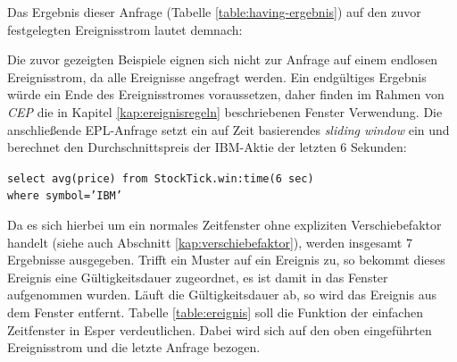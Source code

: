 \documentclass{acm_proc_article-sp}
\begin{document}
Das Ergebnis dieser Anfrage (Tabelle \ref{table:having-ergebnis}) auf den zuvor 
festgelegten Ereignisstrom lautet demnach:

\begin{table}[ht]
    \caption{Bedingung mit Aggregation}
    \label{table:having-ergebnis}\vspace{0.2cm}
\end{table}



Die zuvor gezeigten Beispiele eignen sich nicht zur Anfrage auf einem endlosen 
Ereignisstrom, da alle Ereignisse angefragt werden. Ein endgültiges Ergebnis würde ein 
Ende des Ereignisstromes voraussetzen, daher finden im Rahmen von \textit{CEP} die in 
Kapitel \ref{kap:ereignisregeln} beschriebenen Fenster Verwendung. Die anschließende 
EPL-Anfrage setzt ein auf Zeit basierendes \textit{sliding window} ein und berechnet den 
Durchschnittspreis der IBM-Aktie der letzten 6 Sekunden:

\texttt{select  avg(price) from StockTick.win:time(6 sec)\\where symbol='IBM'}

Da es sich hierbei um ein normales Zeitfenster ohne expliziten Verschiebefaktor handelt 
(siehe auch Abschnitt \ref{kap:verschiebefaktor}), werden insgesamt 7 Ergebnisse 
ausgegeben. Trifft ein Muster auf ein Ereignis zu, so bekommt dieses Ereignis eine 
Gültigkeitsdauer zugeordnet, es ist damit in das Fenster aufgenommen wurden. Läuft die 
Gültigkeitsdauer ab, so wird das Ereignis aus dem Fenster entfernt. Tabelle 
\ref{table:ereignis} soll die Funktion der einfachen Zeitfenster in Esper verdeutlichen. 
Dabei wird sich auf den oben eingeführten Ereignisstrom und die letzte Anfrage bezogen.
\end{document}
